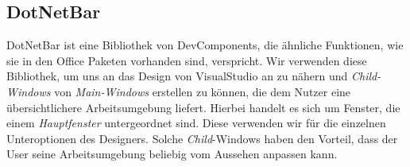 \subsection{DotNetBar}
\label{dotnetbar}
DotNetBar ist eine Bibliothek von DevComponents, die ähnliche Funktionen, wie sie in den Office Paketen vorhanden sind, verspricht. Wir verwenden diese Bibliothek, um uns an das Design von VisualStudio an zu nähern und \textit{Child-Windows} von \textit{Main-Windows} erstellen zu können, die dem Nutzer eine übersichtlichere Arbeitsumgebung liefert. Hierbei handelt es sich um Fenster, die einem \textit{Hauptfenster} untergeordnet sind. Diese verwenden wir für die einzelnen Unteroptionen des Designers. Solche \textit{Child}-Windows haben den Vorteil, dass der User seine Arbeitsumgebung beliebig vom Aussehen anpassen kann. 
